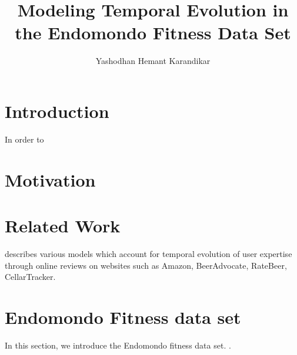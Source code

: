 \documentclass{acm_proc_article-sp}
\begin{document}
\title{Modeling Temporal Evolution in the Endomondo Fitness Data Set}
%
%
\author{
\alignauthor
Yashodhan Hemant Karandikar\\
}

\maketitle
\begin{abstract}

\end{abstract}

\section{Introduction}
In order to 

\section{Motivation}


\section{Related Work}
\cite{www13} describes various models which account for temporal evolution of user expertise through online reviews on websites such as Amazon, BeerAdvocate, RateBeer, CellarTracker. 

\section{Endomondo Fitness data set}
\label{expAnalysis}
In this section, we introduce the Endomondo fitness data set. \cite{mldataset}. 

\begin{comment}
\begin{figure}[h]
\centering
\texttt{[image: plots/rating\_vs\_age]}
\caption{\label{plotRatingVsAge}Average rating for different age groups}
\end{figure}

\begin{figure*}
\centering
\texttt{[image: plots/rating\_vs\_occupation]}
\caption{\label{plotRatingVsOcc} Average rating for various occupations}
\end{figure*}
\end{comment}

\begin{comment}
\begin{figure*}
\centering
\texttt{[image: plots/rating\_vs\_genre]}
\caption{\label{plotRatingVsGenre} Average rating for various movie genres}
\end{figure*}
\end{comment}
\end{document}
